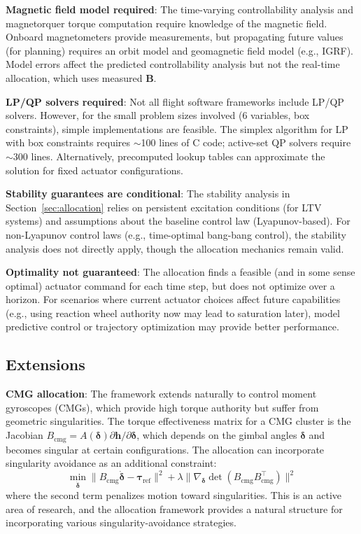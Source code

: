 \documentclass[conference]{IEEEtran}
\begin{document}
\textbf{Magnetic field model required}: The time-varying controllability analysis and magnetorquer torque computation require knowledge of the magnetic field. Onboard magnetometers provide measurements, but propagating future values (for planning) requires an orbit model and geomagnetic field model (e.g., IGRF). Model errors affect the predicted controllability analysis but not the real-time allocation, which uses measured $\mathbf{B}$.

\textbf{LP/QP solvers required}: Not all flight software frameworks include LP/QP solvers. However, for the small problem sizes involved (6 variables, box constraints), simple implementations are feasible. The simplex algorithm for LP with box constraints requires $\sim$100 lines of C code; active-set QP solvers require $\sim$300 lines. Alternatively, precomputed lookup tables can approximate the solution for fixed actuator configurations.

\textbf{Stability guarantees are conditional}: The stability analysis in Section~\ref{sec:allocation} relies on persistent excitation conditions (for LTV systems) and assumptions about the baseline control law (Lyapunov-based). For non-Lyapunov control laws (e.g., time-optimal bang-bang control), the stability analysis does not directly apply, though the allocation mechanics remain valid.

\textbf{Optimality not guaranteed}: The allocation finds a feasible (and in some sense optimal) actuator command for each time step, but does not optimize over a horizon. For scenarios where current actuator choices affect future capabilities (e.g., using reaction wheel authority now may lead to saturation later), model predictive control or trajectory optimization may provide better performance.

\subsection{Extensions}

\textbf{CMG allocation}: The framework extends naturally to control moment gyroscopes (CMGs), which provide high torque authority but suffer from geometric singularities. The torque effectiveness matrix for a CMG cluster is the Jacobian $B_{\text{cmg}} = A(\boldsymbol{\delta}) \partial\mathbf{h}/\partial\boldsymbol{\delta}$, which depends on the gimbal angles $\boldsymbol{\delta}$ and becomes singular at certain configurations. The allocation can incorporate singularity avoidance as an additional constraint:
\begin{equation}
\min_{\dot{\boldsymbol{\delta}}} \|B_{\text{cmg}} \dot{\boldsymbol{\delta}} - \boldsymbol{\tau}_{\text{ref}}\|^2 + \lambda \| \nabla_{\boldsymbol{\delta}} \det(B_{\text{cmg}} B_{\text{cmg}}^\top) \|^2
\end{equation}
where the second term penalizes motion toward singularities. This is an active area of research, and the allocation framework provides a natural structure for incorporating various singularity-avoidance strategies.
\end{document}
